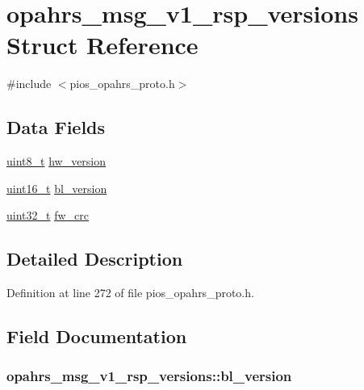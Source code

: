 \hypertarget{structopahrs__msg__v1__rsp__versions}{\section{opahrs\-\_\-msg\-\_\-v1\-\_\-rsp\-\_\-versions Struct Reference}
\label{structopahrs__msg__v1__rsp__versions}
}


{\ttfamily \#include $<$pios\-\_\-opahrs\-\_\-proto.\-h$>$}

\subsection*{Data Fields}
\begin{DoxyCompactItemize}
\item 
\hyperlink{stdint_8h_aba7bc1797add20fe3efdf37ced1182c5}{uint8\-\_\-t} \hyperlink{structopahrs__msg__v1__rsp__versions_a002384f85150d4ee542dd0dcc80cc4f4}{hw\-\_\-version}
\item 
\hyperlink{stdint_8h_a273cf69d639a59973b6019625df33e30}{uint16\-\_\-t} \hyperlink{structopahrs__msg__v1__rsp__versions_a1221d17532beedaac7699f8c1aa95f25}{bl\-\_\-version}
\item 
\hyperlink{stdint_8h_a435d1572bf3f880d55459d9805097f62}{uint32\-\_\-t} \hyperlink{structopahrs__msg__v1__rsp__versions_a6a004ed79625b3af8be61a1ae8f3c91d}{fw\-\_\-crc}
\end{DoxyCompactItemize}


\subsection{Detailed Description}


Definition at line 272 of file pios\-\_\-opahrs\-\_\-proto.\-h.



\subsection{Field Documentation}
\hypertarget{structopahrs__msg__v1__rsp__versions_a1221d17532beedaac7699f8c1aa95f25}{
\subsubsection[{bl\-\_\-version}]{ opahrs\-\_\-msg\-\_\-v1\-\_\-rsp\-\_\-versions\-::bl\-\_\-version}}\label{structopahrs__msg__v1__rsp__versions_a1221d17532beedaac7699f8c1aa95f25}


